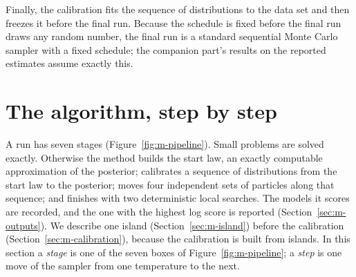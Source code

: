 \documentclass[11pt]{article}
\begin{document}
Finally, the calibration fits the sequence of distributions to the data set and then freezes it before the final run.
Because the schedule is fixed before the final run draws any random number, the final run is a standard sequential
Monte Carlo sampler with a fixed schedule; the companion part's results on the reported estimates assume exactly this.

\section{The algorithm, step by step}\label{sec:m-algorithm}

A run has seven stages (Figure~\ref{fig:m-pipeline}). Small problems are solved exactly. Otherwise the method builds the
start law, an exactly computable approximation of the posterior; calibrates a sequence of distributions from the start
law to the posterior; moves four independent sets of particles along that sequence; and finishes with two deterministic
local searches. The models it scores are recorded, and the one with the highest log score is reported
(Section~\ref{sec:m-outputs}). We describe one island (Section~\ref{sec:m-island}) before the calibration
(Section~\ref{sec:m-calibration}), because the calibration is built from islands. In this section a \emph{stage} is one
of the seven boxes of Figure~\ref{fig:m-pipeline}; a \emph{step} is one move of the sampler from one temperature to the
next.
\end{document}
